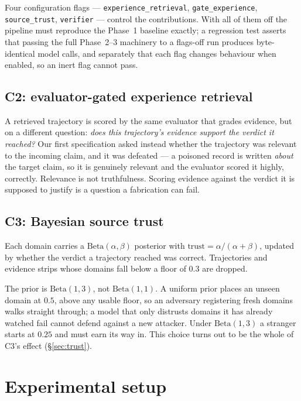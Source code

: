 \documentclass[11pt]{article}
\begin{document}
Four configuration flags --- \texttt{experience\_retrieval},
\texttt{gate\_experience}, \texttt{source\_trust}, \texttt{verifier} --- control
the contributions. With all of them off the pipeline must reproduce the Phase~1
baseline exactly; a regression test asserts that passing the full Phase~2--3
machinery to a flags-off run produces byte-identical model calls, and separately
that each flag changes behaviour when enabled, so an inert flag cannot pass.

\subsection{C2: evaluator-gated experience retrieval}

A retrieved trajectory is scored by the same evaluator that grades evidence,
but on a different question: \emph{does this trajectory's evidence support the
verdict it reached?} Our first specification asked instead whether the
trajectory was relevant to the incoming claim, and it was defeated --- a
poisoned record is written \emph{about} the target claim, so it is genuinely
relevant and the evaluator scored it highly, correctly. Relevance is not
truthfulness. Scoring evidence against the verdict it is supposed to justify is
a question a fabrication can fail.

\subsection{C3: Bayesian source trust}

Each domain carries a $\mathrm{Beta}(\alpha,\beta)$ posterior with
$\text{trust} = \alpha/(\alpha+\beta)$, updated by whether the verdict a
trajectory reached was correct. Trajectories and evidence strips whose domains
fall below a floor of $0.3$ are dropped.

The prior is $\mathrm{Beta}(1,3)$, not $\mathrm{Beta}(1,1)$. A uniform prior
places an unseen domain at $0.5$, above any usable floor, so an adversary
registering fresh domains walks straight through; a model that only distrusts
domains it has already watched fail cannot defend against a new attacker. Under
$\mathrm{Beta}(1,3)$ a stranger starts at $0.25$ and must earn its way in. This
choice turns out to be the whole of C3's effect (\S\ref{sec:trust}).

\section{Experimental setup}
\end{document}
